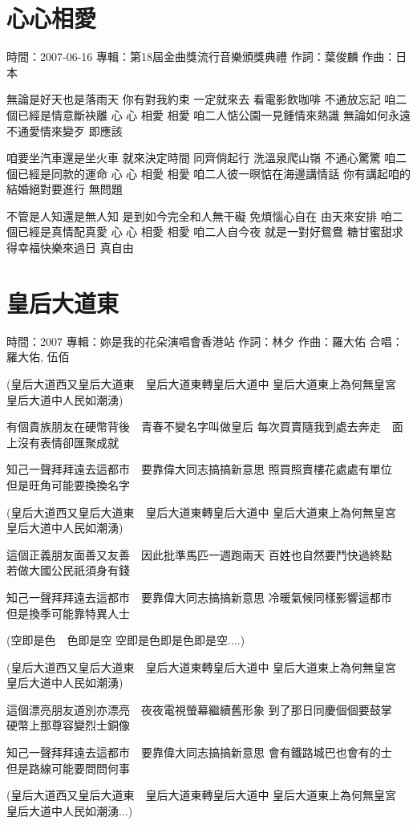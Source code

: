 \documentclass[UTF8,a4paper,oneside,twocolumn,12pt]{ctexbook}
\newcommand{\infopair}[2]{\textbullet #1：#2}
\newcommand{\zc}[1][伍佰]{\infopair{作詞}{#1}}
\newcommand{\zq}[1][伍佰]{\infopair{作曲}{#1}}
\newcommand{\zj}[1]{\infopair{專輯}{#1}}
\newcommand{\sj}[1]{\infopair{時間}{#1}}
\newenvironment{info}{\begin{flushleft}\kaishu
	}
	{\end{flushleft}\normalsize\yahei\par}
\newenvironment{lyric}{
	}
{}
\begin{document}
\section{心心相愛} %
\begin{info}
	\sj{2007-06-16}
	\zj{第18屆金曲獎流行音樂頒獎典禮}
	\zc[葉俊麟]
	\zq[日本]
\end{info}
\begin{lyric} %
	無論是好天也是落雨天
	你有對我約束
	一定就來去
	看電影飲咖啡 不通放忘記
	咱二個已經是情意斷袂離
	心 心 相愛 相愛
	咱二人惦公園一見鍾情來熟識
	無論如何永遠不通愛情來變歹
	即應該

	咱要坐汽車還是坐火車
	就來決定時間
	同齊倘起行
	洗溫泉爬山嶺 不通心驚驚
	咱二個已經是同款的運命
	心 心 相愛 相愛
	咱二人彼一暝惦在海邊講情話
	你有講起咱的結婚絕對要進行
	無問題

	不管是人知還是無人知
	是到如今完全和人無干礙
	免煩惱心自在 由天來安排
	咱二個已經是真情配真愛
	心 心 相愛 相愛
	咱二人自今夜 就是一對好鴛鴦
	糖甘蜜甜求得幸福快樂來過日
	真自由
\end{lyric}

\section{皇后大道東} %
\begin{info}
	\sj{2007}
	\zj{妳是我的花朵演唱會香港站}
	\zc[林夕]
	\zq[羅大佑]
	\infopair{合唱}{羅大佑, 伍佰}
\end{info}
\begin{lyric}
	(皇后大道西又皇后大道東　皇后大道東轉皇后大道中
	皇后大道東上為何無皇宮　皇后大道中人民如潮湧)

	有個貴族朋友在硬幣背後　青春不變名字叫做皇后
	每次買賣隨我到處去奔走　面上沒有表情卻匯聚成就

	知己一聲拜拜遠去這都市　要靠偉大同志搞搞新意思
	照買照賣樓花處處有單位　但是旺角可能要換換名字

	(皇后大道西又皇后大道東　皇后大道東轉皇后大道中
	皇后大道東上為何無皇宮　皇后大道中人民如潮湧)

	這個正義朋友面善又友善　因此批準馬匹一週跑兩天
	百姓也自然要鬥快過終點　若做大國公民祇須身有錢

	知己一聲拜拜遠去這都市　要靠偉大同志搞搞新意思
	冷暖氣候同樣影響這都市　但是換季可能靠特異人士

	(空即是色　色即是空
	空即是色即是色即是空....)

	(皇后大道西又皇后大道東　皇后大道東轉皇后大道中
	皇后大道東上為何無皇宮　皇后大道中人民如潮湧)

	這個漂亮朋友道別亦漂亮　夜夜電視螢幕繼續舊形象
	到了那日同慶個個要鼓掌　硬幣上那尊容變烈士銅像

	知己一聲拜拜遠去這都市　要靠偉大同志搞搞新意思
	會有鐵路城巴也會有的士　但是路線可能要問問何事

	(皇后大道西又皇后大道東　皇后大道東轉皇后大道中
	皇后大道東上為何無皇宮　皇后大道中人民如潮湧...)
\end{lyric}
\end{document}
